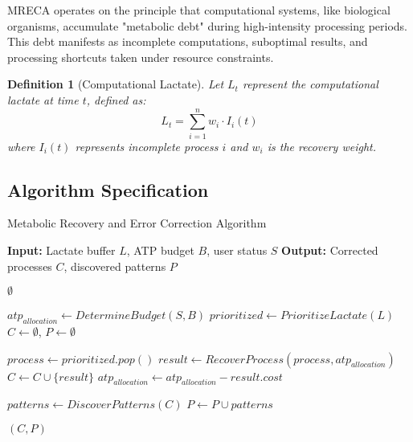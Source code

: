 \documentclass[12pt,a4paper]{article}
\newtheorem{definition}[theorem]{Definition}
\begin{document}
MRECA operates on the principle that computational systems, like biological organisms, accumulate "metabolic debt" during high-intensity processing periods. This debt manifests as incomplete computations, suboptimal results, and processing shortcuts taken under resource constraints.

\begin{definition}[Computational Lactate]
Let $L_t$ represent the computational lactate at time $t$, defined as:
\begin{equation}
L_t = \sum_{i=1}^{n} w_i \cdot I_i(t)
\end{equation}
where $I_i(t)$ represents incomplete process $i$ and $w_i$ is the recovery weight.
\end{definition}

\subsection{Algorithm Specification}

\begin{algorithm}[H]
\caption{Metabolic Recovery and Error Correction Algorithm}
\begin{algorithmic}[1]
\State \textbf{Input:} Lactate buffer $L$, ATP budget $B$, user status $S$
\State \textbf{Output:} Corrected processes $C$, discovered patterns $P$

        \State \Return $\emptyset$ 
    \EndIf
    
    \State $atp_{allocation} \leftarrow DetermineBudget(S, B)$
    \State $prioritized \leftarrow PrioritizeLactate(L)$
    \State $C \leftarrow \emptyset$, $P \leftarrow \emptyset$
    
        \State $process \leftarrow prioritized.pop()$
        \State $result \leftarrow RecoverProcess(process, atp_{allocation})$
        \State $C \leftarrow C \cup \{result\}$
        \State $atp_{allocation} \leftarrow atp_{allocation} - result.cost$
        
            \State $patterns \leftarrow DiscoverPatterns(C)$
            \State $P \leftarrow P \cup patterns$
        \EndIf
    \EndWhile
    
    \State \Return $(C, P)$
\EndFunction
\end{algorithmic}
\end{algorithm}
\end{document}
